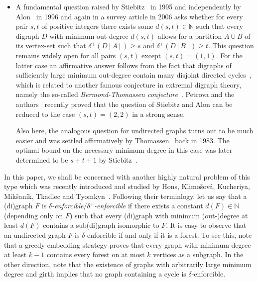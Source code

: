 \documentclass[a4paper,11pt]{article}
\theoremstyle{definition}
\begin{document}
\begin{itemize}
    \item A fundamental question raised by Stiebitz~\cite{Stiebitz95} in 1995 and independently by Alon~\cite{Alon96,Alon06} in 1996 and again in a survey article in 2006 asks whether for every pair $s,t$ of positive integers there exists some $d(s,t)\in \mathbb{N}$ such that every digraph $D$ with minimum out-degree $d(s,t)$ allows for a partition $A\cup B$ of its vertex-set such that $\delta^+(D[A])\geq s$ and $\delta^+(D[B])\geq t$. This question remains widely open for all pairs $(s,t)$ except $(s,t)=(1,1)$. For the latter case an affirmative answer follows from the fact that digraphs of sufficiently large minimum out-degree contain many disjoint directed cycles~\cite{Thomassen83-2, Alon96, Bucic18}, which is related to another famous conjecture in extremal digraph theory, namely the so-called \emph{Bermond-Thomassen conjecture}~\cite{BermondThomassen}. Petrova and the authors~\cite{Christoph25} recently proved that the question of Stiebitz and Alon can be reduced to the case $(s,t)=(2,2)$ in a strong sense.
    
    Also here, the analogous question for undirected graphs turns out to be much easier and was settled affirmatively by Thomassen~\cite{Thomassen83} back in 1983. The optimal bound on the necessary minimum degree in this case was later determined to be $s+t+1$ by Stiebitz~\cite{Stiebitz96}. 
\end{itemize}

In this paper, we shall be concerned with another highly natural problem of this type which was recently introduced and studied by Hons, Klimo\v{s}ov\'{a}, Kucheriya, Mik\v{s}an\'{i}k, Tkadlec and Tyomkyn~\cite{hons25}. Following their terminlogy, let us say that a (di)graph $F$ is \emph{$\delta$-enforcible}/\emph{$\delta^+$-enforcible} if there exists a constant $d(F)\in \mathbb{N}$ (depending only on $F$) such that every (di)graph with minimum (out-)degree at least $d(F)$ contains a sub(di)graph isomorphic to $F$. It is easy to observe that an undirected graph $F$ is $\delta$-enforcible if and only if it is a forest. To see this, note that a greedy embedding strategy proves that every graph with minimum degree at least $k-1$ contains every forest on at most $k$ vertices as a subgraph. In the other direction, note that the existence of graphs with arbitrarily large minimum degree and girth implies that no graph containing a cycle is $\delta$-enforcible.
\end{document}
